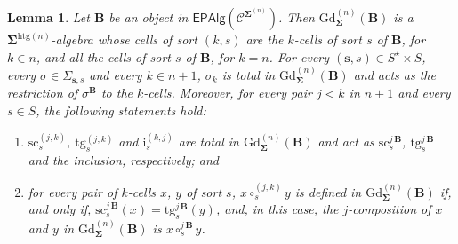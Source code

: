 \documentclass[a4paper, reqno]{amsbook}
\newcommand{\sig}[1]{\mathbf{#1}}             %
\newcommand{\spec}[1]{\boldsymbol{\mathcal{#1}}} %
\newcommand{\htg}{\mathrm{htg}}                %
\newcommand{\src}{\mathrm{sc}}
\newcommand{\tgt}{\mathrm{tg}}
\newcommand{\Gd}{\mathrm{Gd}}
\theoremstyle{plain}
\newtheorem{lemma}[theorem]{Lemma}
\theoremstyle{definition}
\begin{document}
\begin{lemma}\label{LGdDescription}
Let $\mathbf{B}$ be an object in $\mathsf{EPAlg}(\spec{C}^{\sig{\Sigma}^{(n)}})$.
Then $\Gd^{(n)}_{\sig{\Sigma}}(\mathbf{B})$ is a $\sig{\Sigma}^{\htg(n)}$-algebra whose cells of sort $(k,s)$ are the $k$-cells of sort $s$ of $\mathbf{B}$, for $k\in n$, and all the cells of sort $s$ of $\mathbf{B}$, for $k=n$.
For every $(\mathbf{s},s)\in S^{\star}\times S$, every $\sigma\in\Sigma_{\mathbf{s},s}$ and every $k\in n+1$, $\sigma_k$ is total in $\Gd^{(n)}_{\sig{\Sigma}}(\mathbf{B})$ and acts as the restriction of $\sigma^{\mathbf{B}}$ to the $k$-cells.
Moreover, for every pair $j<k$ in $n+1$ and every $s\in S$, the following statements hold:
\begin{enumerate}
\item $\src^{(j,k)}_{s}$, $\tgt^{(j,k)}_{s}$ and $\mathrm{i}^{(k,j)}_{s}$ are total in $\Gd^{(n)}_{\sig{\Sigma}}(\mathbf{B})$ and act as $\src^{j\,\mathbf{B}}_{s}$, $\tgt^{j\,\mathbf{B}}_{s}$ and the inclusion, respectively; and
\item for every pair of $k$-cells $x$, $y$ of sort $s$, $x\circ^{(j,k)}_{s}y$ is defined in $\Gd^{(n)}_{\sig{\Sigma}}(\mathbf{B})$ if, and only if, $\src^{j\,\mathbf{B}}_{s}(x)=\tgt^{j\,\mathbf{B}}_{s}(y)$, and, in this case, the $j$-composition of $x$ and $y$ in $\Gd^{(n)}_{\sig{\Sigma}}(\mathbf{B})$ is $x\circ^{j\,\mathbf{B}}_{s}y$.
\end{enumerate}
\end{lemma}
\end{document}
